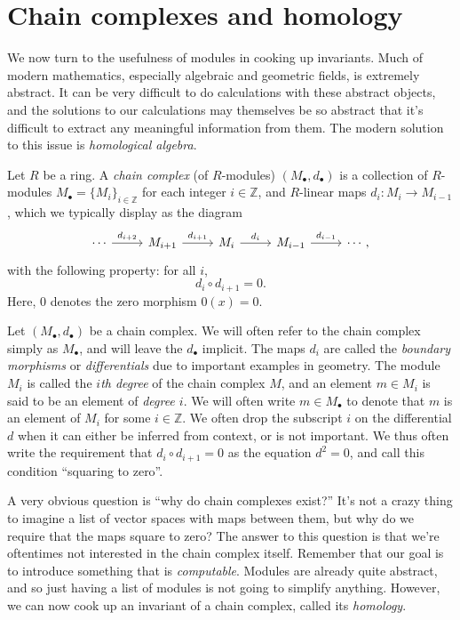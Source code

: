 \section{Chain complexes and homology}

We now turn to the usefulness of modules in cooking up invariants. Much of modern mathematics, especially algebraic and geometric fields, is extremely abstract. It can be very difficult to do calculations with these abstract objects, and the solutions to our calculations may themselves be so abstract that it's difficult to extract any meaningful information from them. The modern solution to this issue is \emph{homological algebra}.

\begin{definition}\label{dfn:chain-complex}
	Let $R$ be a ring. A \emph{chain complex} (of $R$-modules) $(M_{\bullet},d_{\bullet} )$  is a collection of $R$-modules $M_{\bullet} =\{M_i\}_{i\in\mathbb{Z} }$ for each integer $i\in\mathbb{Z} $, and $R$-linear maps $d_i : M_i \to M_{i-1} $, which we typically display as the diagram
	\[
		\begin{tikzcd}[row sep = 2.5em, column sep = 2.5em]
		\cdots \ar[" d_{i+2}  ", r]  & M_{i+1} \ar[" d_{i+1}  ", r]  & M_i \ar[" d_i ", r]  & M_{i-1} \ar[" d_{i-1}  ", r]  & \cdots ,
	\end{tikzcd}
	\]
	with the following property: for all $i$,
	\[
		d_i \circ d_{i+1} =0
	.\]
	Here, $0$ denotes the zero morphism $0(x)=0$.
\end{definition}

\begin{terminology}\label{term:chains}
	Let $(M_{\bullet} ,d_{\bullet} )$ be a chain complex. We will often refer to the chain complex simply as $M_{\bullet} $, and will leave the $d_{\bullet} $ implicit.  The maps $d_i$ are called the \emph{boundary morphisms} or \emph{differentials} due to important examples in geometry. The module $M_i$ is called the \emph{$i$th degree} of the chain complex $M$, and an element $m\in M_i$ is said to be an element of \emph{degree $i$}. We will often write $m\in M_{\bullet} $ to denote that $m$ is an element of $M_i$ for some $i\in\mathbb{Z} $. We often drop the subscript $i$ on the differential $d$ when it can either be inferred from context, or is not important. We thus often write the requirement that $d_i \circ d_{i+1} =0$ as the equation $d^2=0$, and call this condition ``squaring to zero''.
\end{terminology}

A very obvious question is ``why do chain complexes exist?'' It's not a crazy thing to imagine a list of vector spaces with maps between them, but why do we require that the maps square to zero? The answer to this question is that we're oftentimes not interested in the chain complex itself. Remember that our goal is to introduce something that is \emph{computable}. Modules are already quite abstract, and so just having a list of modules is not going to simplify anything. However, we can now cook up an invariant of a chain complex, called its \emph{homology}.


